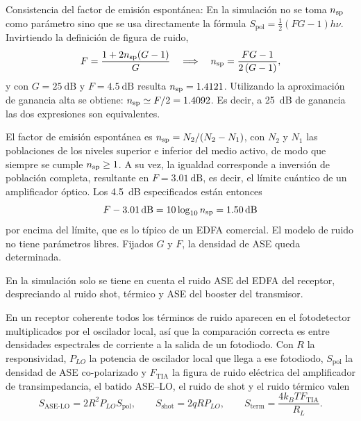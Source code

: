 \begin{puntos}
  \item Consistencia del factor de emisi\'on espont\'anea:
En la simulaci\'on no se toma $n_{\mathrm{sp}}$ como par\'ametro sino que se usa directamente la f\'ormula
$S_{\mathrm{pol}} = \tfrac12(FG-1)h\nu$. Invirtiendo la
definici\'on de figura de ruido,
\begin{equation}
  F = \frac{1 + 2n_{\mathrm{sp}}(G-1)}{G}
  \quad\Longrightarrow\quad
  n_{\mathrm{sp}} = \frac{FG - 1}{2\,(G-1)},
  \label{eq:nsp-exacto}
\end{equation}
y con $G = \SI{25}{\dB}$ y $F = \SI{4.5}{\dB}$ resulta $n_{\mathrm{sp}} = \num{1.4121}$.
Utilizando la aproximaci\'on de ganancia alta se obtiene: $n_{\mathrm{sp}} \simeq F/2 = \num{1.4092}$. Es decir,
a \SI{25}{\dB} de ganancia las dos expresiones son equivalentes.

El factor de emisi\'on espont\'anea
es $n_{\mathrm{sp}} = N_2/(N_2 - N_1)$, con $N_2$ y $N_1$ las poblaciones de los niveles
superior e inferior del medio activo, de modo que siempre se cumple $n_{\mathrm{sp}} \ge 1$. A su vez, la igualdad
corresponde a inversi\'on de poblaci\'on completa, resultante en
$F = \SI{3.01}{\dB}$, es decir, el l\'imite cu\'antico de un amplificador \'optico. Los
\SI{4.5}{\dB} especificados est\'an entonces
\begin{equation}
  F - \SI{3.01}{\dB} = 10\log_{10}\nsp = \SI{1.50}{\dB}
  \label{eq:exceso-nf}
\end{equation}
por encima del l\'imite, que es lo t\'ipico de un EDFA comercial.
El modelo de
ruido no tiene par\'ametros libres. Fijados $G$ y $F$, la densidad de ASE queda
determinada. 

  \item En la simulaci\'on solo se tiene en cuenta el ruido ASE del EDFA del receptor,
 despreciando al ruido shot, t\'ermico y ASE del booster del transmisor.

En un receptor coherente todos los t\'erminos de ruido aparecen en el
fotodetector multiplicados por el oscilador local, as\'i que la comparaci\'on
correcta es entre densidades espectrales de corriente a la salida de un
fotodiodo. Con $R$ la responsividad, $P_{LO}$ la potencia de oscilador local
que llega a ese fotodiodo, $S_{\mathrm{pol}}$ la densidad de ASE
co-polarizado y $F_{\mathrm{TIA}}$ la figura de ruido el\'ectrica del amplificador de
transimpedancia, el batido ASE--LO, el ruido de shot y el ruido t\'ermico
valen
\begin{equation}
  S_{\mathrm{ASE\text{-}LO}} = 2R^{2}P_{LO}S_{\mathrm{pol}},
  \qquad
  S_{\mathrm{shot}} = 2qRP_{LO},
  \qquad
  S_{\mathrm{term}} = \frac{4k_BT F_{\mathrm{TIA}}}{R_L}.
  \label{eq:ruidos}
\end{equation}


\end{puntos}
